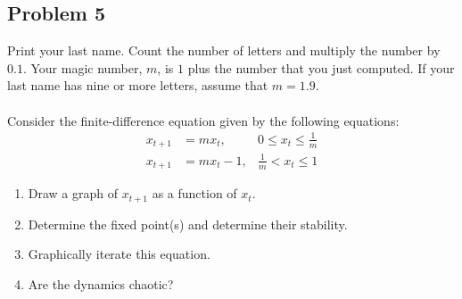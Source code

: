 \documentclass[11pt]{article}
\begin{document}
\subsection*{Problem 5}
Print your last name. Count the number of letters and multiply the number by $0.1$. Your magic number, $m$, is $1$ plus the number that you just computed. If your last name has nine or more letters, assume that $m = 1.9$.\\\\
Consider the finite-difference equation given by the following equations:
\begin{eqnarray*}
x_{t+1} &= m x_t, & 0 \le x_t \le \frac{1}{m} \\
x_{t+1} &= m x_t - 1, & \frac{1}{m} < x_t \le 1
\end{eqnarray*}

\begin{enumerate}
    \item[(a)] Draw a graph of $x_{t+1}$ as a function of $x_t$.
    \item[(b)] Determine the fixed point(s) and determine their stability.
    \item[(c)] Graphically iterate this equation.
    \item[(d)] Are the dynamics chaotic?
\end{enumerate}
\end{document}
